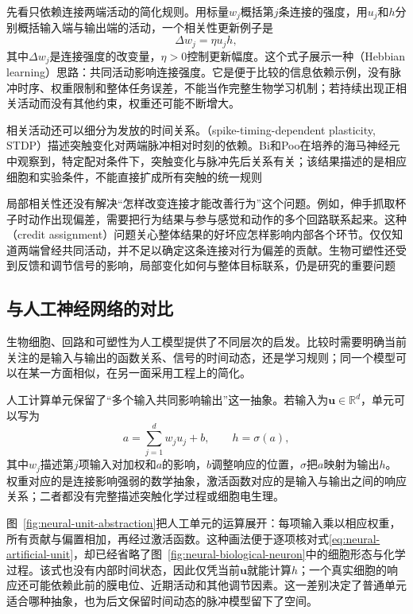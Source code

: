 先看只依赖连接两端活动的简化规则。用标量$w_j$概括第$j$条连接的强度，用$u_j$和$h$分别概括输入端与输出端的活动，一个相关性更新例子是
\begin{equation}
  \Delta w_j=\eta u_j h,
  \label{eq:neural-local-correlation}
\end{equation}
其中$\Delta w_j$是连接强度的改变量，$\eta>0$控制更新幅度。这个式子展示一种（Hebbian learning）思路：共同活动影响连接强度。它是便于比较的信息依赖示例，没有脉冲时序、权重限制和整体任务误差，不能当作完整生物学习机制；若持续出现正相关活动而没有其他约束，权重还可能不断增大。

相关活动还可以细分为发放的时间关系。（spike-timing-dependent plasticity, STDP）描述突触变化对两端脉冲相对时刻的依赖。Bi和Poo在培养的海马神经元中观察到，特定配对条件下，突触变化与脉冲先后关系有关；该结果描述的是相应细胞和实验条件，不能直接扩成所有突触的统一规则

局部相关性还没有解决“怎样改变连接才能改善行为”这个问题。例如，伸手抓取杯子时动作出现偏差，需要把行为结果与参与感觉和动作的多个回路联系起来。这种（credit assignment）问题关心整体结果的好坏应怎样影响内部各个环节。仅仅知道两端曾经共同活动，并不足以确定这条连接对行为偏差的贡献。生物可塑性还受到反馈和调节信号的影响，局部变化如何与整体目标联系，仍是研究的重要问题

\subsection{与人工神经网络的对比}
\label{sec:neural-biological-comparison}

生物细胞、回路和可塑性为人工模型提供了不同层次的启发。比较时需要明确当前关注的是输入与输出的函数关系、信号的时间动态，还是学习规则；同一个模型可以在某一方面相似，在另一面采用工程上的简化。

人工计算单元保留了“多个输入共同影响输出”这一抽象。若输入为$\bm{u}\in\mathbb{R}^{d}$，单元可以写为
\begin{equation}
  a=\sum_{j=1}^{d}w_j u_j+b,\qquad h=\sigma(a),
  \label{eq:neural-artificial-unit}
\end{equation}
其中$w_j$描述第$j$项输入对加权和$a$的影响，$b$调整响应的位置，$\sigma$把$a$映射为输出$h$。权重对应的是连接影响强弱的数学抽象，激活函数对应的是输入与输出之间的响应关系；二者都没有完整描述突触化学过程或细胞电生理。

图~\ref{fig:neural-unit-abstraction}把人工单元的运算展开：每项输入乘以相应权重，所有贡献与偏置相加，再经过激活函数。这种画法便于逐项核对式\eqref{eq:neural-artificial-unit}，却已经省略了图~\ref{fig:neural-biological-neuron}中的细胞形态与化学过程。该式也没有内部时间状态，因此仅凭当前$\bm{u}$就能计算$h$；一个真实细胞的响应还可能依赖此前的膜电位、近期活动和其他调节因素。这一差别决定了普通单元适合哪种抽象，也为后文保留时间动态的脉冲模型留下了空间。

